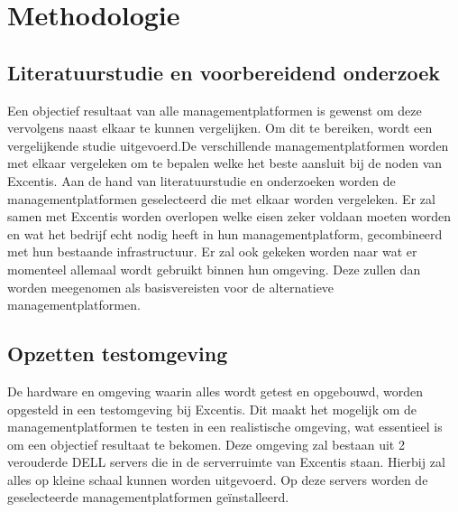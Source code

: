 

\section{Methodologie}%
\label{sec:methodologie}
\subsection{Literatuurstudie en voorbereidend onderzoek}
Een objectief resultaat van alle managementplatformen is gewenst om deze vervolgens naast elkaar te kunnen vergelijken. Om dit te bereiken, wordt een vergelijkende studie uitgevoerd.De verschillende managementplatformen worden met elkaar vergeleken om te bepalen welke het beste aansluit bij de noden van Excentis.
Aan de hand van literatuurstudie en onderzoeken worden de managementplatformen geselecteerd die met elkaar worden vergeleken.
Er zal samen met Excentis worden overlopen welke eisen zeker voldaan moeten worden en wat het bedrijf echt nodig heeft in hun managementplatform, gecombineerd met hun bestaande infrastructuur. Er zal ook gekeken worden naar wat er momenteel allemaal wordt gebruikt binnen hun omgeving. Deze zullen dan worden meegenomen als basisvereisten voor de alternatieve managementplatformen.

\subsection{Opzetten testomgeving}
De hardware en omgeving waarin alles wordt getest en opgebouwd, worden opgesteld in een testomgeving bij Excentis. Dit maakt het mogelijk om de managementplatformen te testen in een realistische omgeving, wat essentieel is om een objectief resultaat te bekomen.
Deze omgeving zal bestaan uit 2 verouderde DELL servers die in de serverruimte van Excentis staan. Hierbij zal alles op kleine schaal kunnen worden uitgevoerd.
Op deze servers worden de geselecteerde managementplatformen geïnstalleerd.
